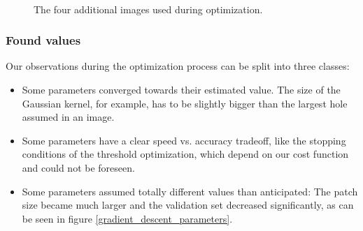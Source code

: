 \documentclass[10pt,conference,compsocconf]{IEEEtran}
\begin{document}
\begin{figure}
  \centering
  ~
  ~
  ~
  ~
  \caption{The four additional images used during optimization.}
  \label{new_images}
\end{figure}

\subsubsection{Found values}
Our observations during the optimization process can be split into three classes:
\begin{itemize}
\item Some parameters converged towards their estimated value. The size of the Gaussian kernel, for example, has to be slightly bigger than the largest hole assumed in an image.
\item Some parameters have a clear speed vs. accuracy tradeoff, like the stopping conditions of the threshold optimization, which depend on our cost function and could not be foreseen.
\item Some parameters assumed totally different values than anticipated: The patch size became much larger and the validation set decreased significantly, as can be seen in figure \ref{gradient_descent_parameters}.
\end{itemize}
\end{document}
